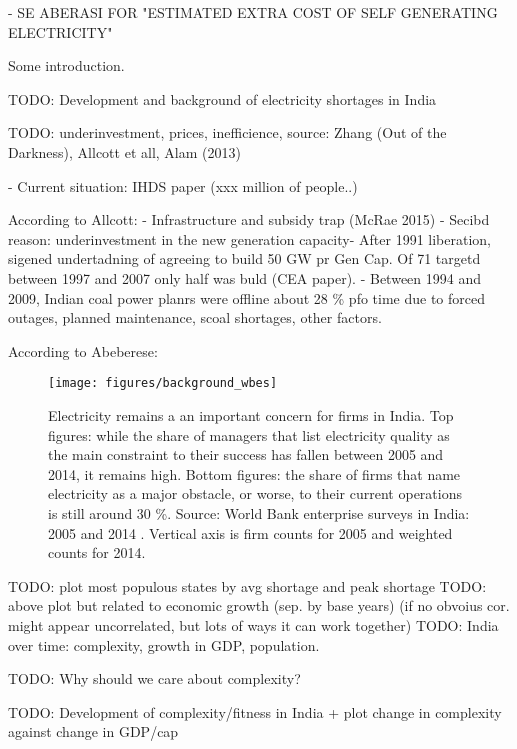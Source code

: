 \documentclass[11pt]{article}
\begin{document}
- SE ABERASI FOR "ESTIMATED EXTRA COST OF SELF GENERATING ELECTRICITY"

Some introduction.

TODO: Development and background of electricity shortages in India

TODO: underinvestment, prices, inefficience, source: Zhang (Out of the Darkness), Allcott et all, Alam (2013)

- Current situation:
IHDS paper (xxx million of people..)

According to Allcott:
- Infrastructure and subsidy trap (McRae 2015)
- Secibd reason: underinvestment in the new generation capacity- After 1991 liberation, sigened undertadning of agreeing to build 50 GW pr Gen Cap. Of 71 targetd between 1997 and 2007 only half was buld (CEA paper).
- Between 1994 and 2009, Indian coal power planrs were offline about 28 \% pfo time due to forced outages, planned maintenance, scoal shortages, other factors. 

According to Abeberese:

\begin{figure}[htpb]
	\centering
	\texttt{[image: figures/background\_wbes]}
	\caption{Electricity remains a an important concern for firms in India. Top figures: while the share of managers that list electricity quality as the main constraint to their success has fallen between 2005 and 2014, it remains high. Bottom figures: the share of firms that name electricity as a major obstacle, or worse, to their current operations is still around 30 \%. Source: World Bank enterprise surveys in India: 2005 and 2014 \citep{world_bank_enterprise_2020-2,world_bank_enterprise_2020-1}. Vertical axis is firm counts for 2005 and weighted counts for 2014.}
	\label{fig:biggest_obstacle}
\end{figure}



TODO: plot most populous states by avg shortage and peak shortage
TODO: above plot but related to economic growth (sep. by base years) (if no obvoius cor. might appear uncorrelated, but lots of ways it can work together)
TODO: India over time: complexity, growth in GDP, population.

TODO: Why should we care about complexity?

TODO: Development of complexity/fitness in India + plot change in complexity against change in GDP/cap

\end{document}
